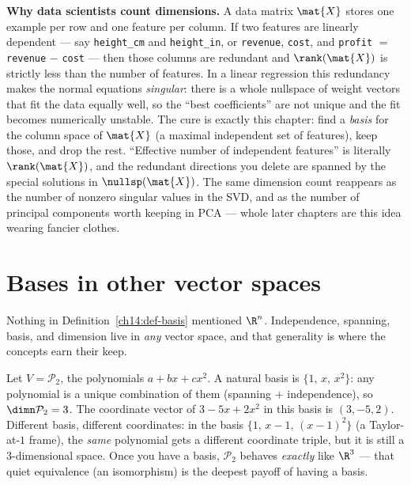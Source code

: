 \begin{applicationbox}
\textbf{Why data scientists count dimensions.} A data matrix $\mat{X}$ stores one
example per row and one feature per column. If two features are linearly dependent
--- say \texttt{height\_cm} and \texttt{height\_in}, or
\texttt{revenue}, \texttt{cost}, and \texttt{profit} $=$ \texttt{revenue} $-$
\texttt{cost} --- then those columns are redundant and $\rank(\mat{X})$ is
strictly less than the number of features. In a linear regression this redundancy
makes the normal equations \emph{singular}: there is a whole nullspace of weight
vectors that fit the data equally well, so the ``best coefficients'' are not
unique and the fit becomes numerically unstable. The cure is exactly this
chapter: find a \emph{basis} for the column space of $\mat{X}$ (a maximal
independent set of features), keep those, and drop the rest. ``Effective number
of independent features'' is literally $\rank(\mat{X})$, and the redundant
directions you delete are spanned by the special solutions in $\nullsp(\mat{X})$.
The same dimension count reappears as the number of nonzero singular values in
the SVD, and as the number of principal components worth keeping in PCA --- whole
later chapters are this idea wearing fancier clothes.
\end{applicationbox}

\section{Bases in other vector spaces}
\label{ch14:other}

Nothing in Definition~\ref{ch14:def-basis} mentioned $\R^n$. Independence,
spanning, basis, and dimension live in \emph{any} vector space, and that
generality is where the concepts earn their keep.

\begin{example}
\label{ch14:ex-poly}
Let $V = \mathcal P_2$, the polynomials $a + bx + cx^2$. A natural basis is
$\{1,\, x,\, x^2\}$: any polynomial is a unique combination of them (spanning $+$
independence), so $\dimn \mathcal P_2 = 3$. The coordinate vector of $3 - 5x +
2x^2$ in this basis is $(3,-5,2)$. Different basis, different coordinates: in the
basis $\{1,\, x-1,\, (x-1)^2\}$ (a Taylor-at-$1$ frame), the \emph{same}
polynomial gets a different coordinate triple, but it is still a $3$-dimensional
space. Once you have a basis, $\mathcal P_2$ behaves \emph{exactly} like $\R^3$ ---
that quiet equivalence (an isomorphism) is the deepest payoff of having a basis.
\end{example}

